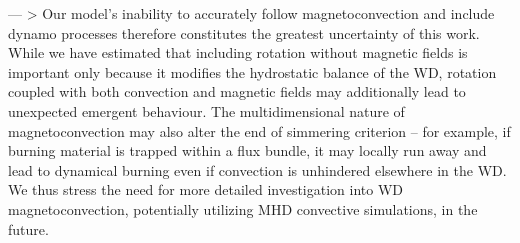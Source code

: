 ---
> Our model's inability to accurately follow magnetoconvection and include dynamo processes therefore constitutes the greatest uncertainty of this work.  While we have estimated that including rotation without magnetic fields is important only because it modifies the hydrostatic balance of the WD, rotation coupled with both convection and magnetic fields may additionally lead to unexpected emergent behaviour.  The multidimensional nature of magnetoconvection may also alter the end of simmering criterion -- for example, if burning material is trapped within a flux bundle, it may locally run away and lead to dynamical burning even if convection is unhindered elsewhere in the WD.  We thus stress the need for more detailed investigation into WD magnetoconvection, potentially utilizing MHD convective simulations, in the future.
